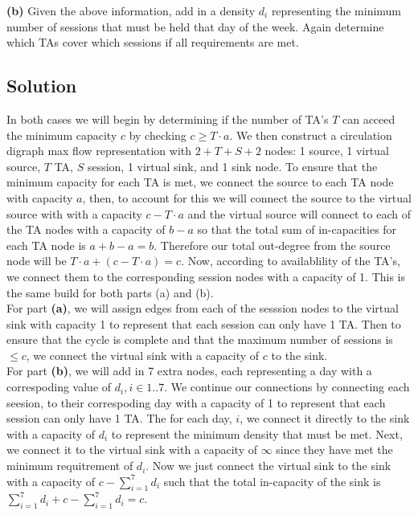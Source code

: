 \documentclass[12pt]{article}
\begin{document}
\noindent \textbf{(b)} Given the above information, add in a density $d_i$ representing the minimum number of sessions that must be
held that day of the week. Again determine which TAs cover which sessions if all requirements are met.


\subsection{Solution}
\indent In both cases we will begin by determining if the number of TA's $T$ can acceed the minimum capacity
$c$ by checking $c \geq T\cdot a$. We then construct a circulation digraph max flow
representation with $2 + T + S + 2$ nodes: 1 source, 1 virtual source, $T$ TA, $S$ session, 1 virtual
sink, and 1 sink node. To ensure that the minimum capacity for each TA is met, we connect the source to each
TA node with capacity $a$, then, to account for this we will connect the source to the virtual source
with with a capacity $c-T\cdot a$ and the virtual source will connect to each of the TA nodes with a
capacity of $b-a$ so that the total sum of in-capacities for each TA node is $a + b - a = b$. Therefore
our total out-degree from the source node will be $T\cdot a + (c - T\cdot a) = c$. Now, according to
availablility of the TA's, we connect them to the corresponding session nodes with a capacity of 1. This
is the same build for both parts (a) and (b). \\

\indent For part \textbf{(a)}, we will assign edges from each of the sesssion nodes to
the virtual sink with capacity 1 to represent that each session can only have 1 TA. Then to ensure that
the cycle is complete and that the maximum number of sessions is $\leq c$, we connect the virtual sink
with a capacity of $c$ to the sink. \\

\indent For part \textbf{(b)}, we will add in 7 extra nodes, each representing a day with a correspoding
value of $d_i, i \in 1..7$. We continue our connections by connecting each seesion, to their correspoding
day with a capacity of 1 to represent that each session can only have 1 TA. The for each day, $i$, we connect
it directly to the sink with a capacity of $d_i$ to represent the minimum density that must be met. Next, we
connect it to the virtual sink with a capacity of $\infty$ since they have met the minimum requitrement of $d_i$.
Now we just connect the virtual sink to the sink with a capacity of $c - \sum_{i = 1}^7 d_i$ such that the
total in-capacity of the sink is  $\sum_{i = 1}^7 d_i + c - \sum_{i = 1}^{7} d_i = c$. \\
\end{document}
